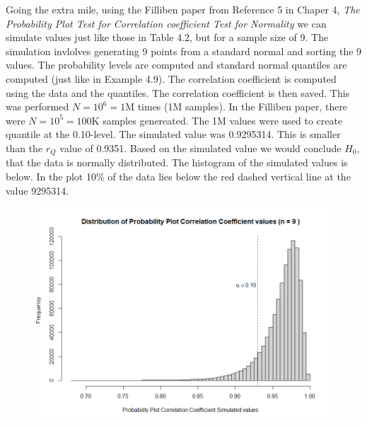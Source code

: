 \begin{enumerate}[label= (\alph*)]
    \newline
    \hspace{0.5in} Going the extra mile, using the Filliben paper from Reference 5 in Chaper 4, \textit{The Probability Plot Test for Correlation coefficient Test for Normality} we can simulate values just like those in Table 4.2, but for a sample size of 9. The simulation invlolves generating 9 points from a standard normal and sorting the 9 values. The probability levels are computed and standard normal quantiles are computed (just like in Example 4.9). The correlation coefficient is computed using the data and the quantiles. The correlation coefficient is then saved. This was performed $N = 10^{6} = 1\text{M}$ times (1M samples). In the Filliben paper, there were $N = 10^{5} = 100\text{K}$ samples genereated. The 1M values were used to create quantile at the 0.10-level. The simulated value was 0.9295314. This is smaller than the $r_{Q}$ value of 0.9351. Based on the simulated value we would conclude $H_{0}$, that the data is normally distributed. The histogram of the simulated values is below. In the plot 10\% of the data lies below the red dashed vertical line at the value 9295314.
    \begin{figure}[H]
        \includegraphics[scale=0.5]{./r/chapter-4/sol4.23b.png}
    \end{figure}
\end{enumerate}